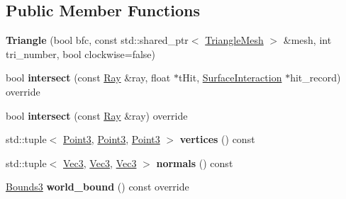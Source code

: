 \subsection*{Public Member Functions}
\begin{DoxyCompactItemize}
\item 
\mbox{\label{classomg_1_1_triangle_acdf8c1867f7cf9b0e9610b94a0a96f76}} 
{\bfseries Triangle} (bool bfc, const std\+::shared\+\_\+ptr$<$ \mbox{\hyperlink{structomg_1_1_triangle_mesh}{Triangle\+Mesh}} $>$ \&mesh, int tri\+\_\+number, bool clockwise=false)
\item 
\mbox{\label{classomg_1_1_triangle_ad22556418d61acfe7aa67d3bb0a5cb40}} 
bool {\bfseries intersect} (const \mbox{\hyperlink{classomg_1_1_ray}{Ray}} \&ray, float $\ast$t\+Hit, \mbox{\hyperlink{classomg_1_1_surface_interaction}{Surface\+Interaction}} $\ast$hit\+\_\+record) override
\item 
\mbox{\label{classomg_1_1_triangle_a4f269b31b840a553da91c5085fd10542}} 
bool {\bfseries intersect} (const \mbox{\hyperlink{classomg_1_1_ray}{Ray}} \&ray) override
\item 
\mbox{\label{classomg_1_1_triangle_a20dd65bc222d4ca0cc14d99d8165e0cd}} 
std\+::tuple$<$ \mbox{\hyperlink{namespaceomg_af85242d35fdacf829d32a6f9b95f3e35}{Point3}}, \mbox{\hyperlink{namespaceomg_af85242d35fdacf829d32a6f9b95f3e35}{Point3}}, \mbox{\hyperlink{namespaceomg_af85242d35fdacf829d32a6f9b95f3e35}{Point3}} $>$ {\bfseries vertices} () const
\item 
\mbox{\label{classomg_1_1_triangle_a84b4f9d9508f0f87d9cd214cc27c74f6}} 
std\+::tuple$<$ \mbox{\hyperlink{namespaceomg_a45a9482677fee9933ff369b49894e316}{Vec3}}, \mbox{\hyperlink{namespaceomg_a45a9482677fee9933ff369b49894e316}{Vec3}}, \mbox{\hyperlink{namespaceomg_a45a9482677fee9933ff369b49894e316}{Vec3}} $>$ {\bfseries normals} () const
\item 
\mbox{\label{classomg_1_1_triangle_a4fcdf7ff7dfca3b2f03c8585fc14ebad}} 
\mbox{\hyperlink{classomg_1_1_bounds3}{Bounds3}} {\bfseries world\+\_\+bound} () const override
\end{DoxyCompactItemize}
